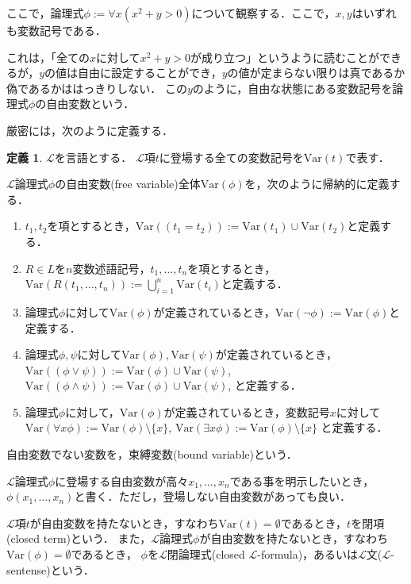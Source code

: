 \documentclass[uplatex, dvipdfmx]{jsarticle}
\numberwithin{equation}{section}
\newcommand{\Var}{\mathrm{Var}}
\theoremstyle{definition}
\newtheorem{definition}{定義}[section]
\begin{document}
ここで，論理式$\phi := \forall x (x^2 + y > 0)$について観察する．ここで，$x,y$はいずれも変数記号である．

これは，「全ての$x$に対して$x^2 + y > 0$が成り立つ」というように読むことができるが，$y$の値は自由に設定することができ，$y$の値が定まらない限りは真であるか偽であるかははっきりしない．
この$y$のように，自由な状態にある変数記号を論理式$\phi$の自由変数という．

厳密には，次のように定義する．

\begin{definition}
     $\mathcal{L}$を言語とする．
     $\mathcal{L}$項$t$に登場する全ての変数記号を$\Var(t)$で表す．

     $\mathcal{L}$論理式$\phi$の自由変数(free variable)全体$\Var(\phi)$を，次のように帰納的に定義する．
     \begin{enumerate}
          \item $t_1, t_2$を項とするとき，$\Var((t_1=t_2)):=\Var(t_1)\cup\Var(t_2)$と定義する．
          \item $R \in L$を$n$変数述語記号，$t_1, \dots, t_n$を項とするとき，$\Var(R(t_1, \dots, t_n)):= \bigcup_{i=1}^n \Var(t_i)$と定義する．
          \item 論理式$\phi$に対して$\Var(\phi)$が定義されているとき，$\Var(\lnot \phi):=\Var(\phi)$と定義する．
          \item 論理式$\phi, \psi$に対して$\Var(\phi), \Var(\psi)$が定義されているとき，
          $\Var((\phi \lor \psi)):=\Var(\phi)\cup\Var(\psi)$,
          $\Var((\phi \land \psi)):=\Var(\phi)\cup\Var(\psi)$,
          と定義する．
          \item 論理式$\phi$に対して，$\Var(\phi)$が定義されているとき，変数記号$x$に対して
          $\Var(\forall x\phi):=\Var(\phi) \setminus \{x\}$,
          $\Var(\exists x\phi):=\Var(\phi) \setminus \{x\}$
          と定義する．
     \end{enumerate}

     自由変数でない変数を，束縛変数(bound variable)という．

     $\mathcal{L}$論理式$\phi$に登場する自由変数が高々$x_1, \dots, x_n$である事を明示したいとき，$\phi(x_1, \dots, x_n)$と書く．ただし，登場しない自由変数があっても良い．

     $\mathcal{L}$項$t$が自由変数を持たないとき，すなわち$\Var(t)=\emptyset$であるとき，$t$を閉項(closed term)という．
     また，$\mathcal{L}$論理式$\phi$が自由変数を持たないとき，すなわち$\Var(\phi)=\emptyset$であるとき，
     $\phi$を$\mathcal{L}$閉論理式(closed $\mathcal{L}$-formula)，あるいは$\mathcal{L}$文($\mathcal{L}$-sentense)という．
\end{definition}
\end{document}
